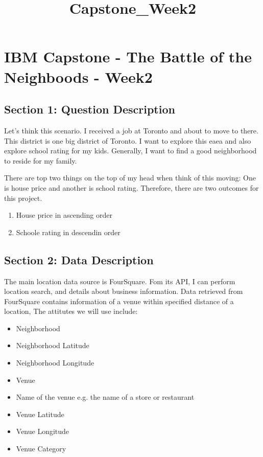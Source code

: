 \documentclass[11pt]{article}
\title{Capstone\_Week2}
\providecommand{\tightlist}{%
      \setlength{\itemsep}{0pt}\setlength{\parskip}{0pt}}
\begin{document}
    
    
    \maketitle
    
    

    
    \section{IBM Capstone - The Battle of the Neighboods -
Week2}\label{ibm-capstone---the-battle-of-the-neighboods---week2}

    \subsection{Section 1: Question
Description}\label{section-1-question-description}

    Let's think this scenario. I received a job at Toronto and about to move
to there. This district is one big district of Toronto. I want to
explore this eaea and also explore school rating for my kids. Generally,
I want to find a good neighborhood to reside for my family.

    There are top two things on the top of my head when think of this
moving: One is house price and another is school rating. Therefore,
there are two outcomes for this project.

\begin{enumerate}
\def\labelenumi{\arabic{enumi}.}
\tightlist
\item
  House price in ascending order
\item
  Schoole rating in descendin order
\end{enumerate}

    \subsection{Section 2: Data
Description}\label{section-2-data-description}

    The main location data source is FourSquare. Fom its API, I can perform
location search, and details about business information. Data retrieved
from FourSquare contains information of a venue within specified
distance of a location, The attitutes we will use include:

\begin{itemize}
\tightlist
\item
  Neighborhood
\item
  Neighborhood Latitude
\item
  Neighborhood Longitude
\item
  Venue
\item
  Name of the venue e.g. the name of a store or restaurant
\item
  Venue Latitude
\item
  Venue Longitude
\item
  Venue Category
\end{itemize}
\end{document}
